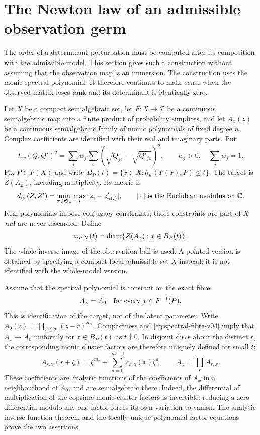 \section{The Newton law of an admissible observation germ}
\label{sec:germ-newton-v94}
The order of a determinant perturbation must be computed after its
composition with the admissible model. This section gives such a
construction without assuming that the observation map is an immersion.
The construction uses the monic spectral polynomial. It therefore
continues to make sense when the observed matrix loses rank and its
determinant is identically zero.

Let $X$ be a compact semialgebraic set, let $F:X\to\mathcal P$ be a
continuous semialgebraic map into a finite product of probability
simplices, and let $A_x(z)$ be a continuous semialgebraic family of
monic polynomials of fixed degree $n$. Complex coefficients are
identified with their real and imaginary parts. Put
\[
 h_w(Q,Q')^2=\sum_jw_j\sum_e(\sqrt{Q_{je}}-\sqrt{Q'_{je}})^2,
 \qquad w_j>0,\quad \sum_jw_j=1.
\]
Fix $P\in F(X)$ and write $B_P(t)=\{x\in X:h_w(F(x),P)\le t\}$.
The target is $Z(A_x)$, including multiplicity. Its metric is
\[
 d_\infty(Z,Z')=\min_{\pi\in\mathfrak S_n}\max_i|z_i-z'_{\pi(i)}|,
 \qquad |\cdot|\text{ is the Euclidean modulus on }\mathbb C.
\]
Real polynomials impose conjugacy constraints; those constraints are
part of $X$ and are never discarded. Define
\begin{equation}\label{eq:germ-modulus-v94}
 \omega_{P,X}(t)=\operatorname{diam}\{Z(A_x):x\in B_P(t)\}.
\end{equation}
The whole inverse image of the observation ball is used. A pointed
version is obtained by specifying a compact local admissible set $X$
instead; it is not identified with the whole-model version.

Assume that the spectral polynomial is constant on the exact fibre:
\begin{equation}\label{eq:spectral-fibre-v94}
 A_x=A_0\quad\hbox{for every }x\in F^{-1}(P).
\end{equation}
This is identification of the target, not of the latent parameter.
Write $A_0(z)=\prod_{r\in\mathcal R}(z-r)^{m_r}$.
Compactness and \eqref{eq:spectral-fibre-v94} imply that $A_x\to A_0$
uniformly for $x\in B_P(t)$ as $t\downarrow0$. In disjoint discs
about the distinct $r$, the corresponding monic cluster factors are
therefore uniquely defined for small $t$:
\begin{equation}\label{eq:cluster-coeff-v94}
 A_{r,x}(r+\zeta)=\zeta^{m_r}
                   +\sum_{a=0}^{m_r-1}c_{r,a}(x)\zeta^a,
 \qquad A_x=\prod_r A_{r,x}.
\end{equation}
These coefficients are analytic functions of the coefficients of $A_x$
in a neighbourhood of $A_0$, and are semialgebraic there. Indeed,
the differential of multiplication of the coprime monic cluster
factors is invertible: reducing a zero differential modulo any one
factor forces its own variation to vanish. The analytic inverse
function theorem and the locally unique polynomial factor equations
prove the two assertions.

